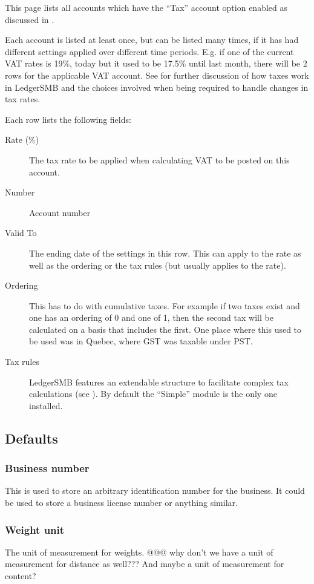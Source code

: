 This page lists all accounts which have the ``Tax'' account option enabled as discussed in .

Each account is listed at least once, but can be listed many times, if it has had different
settings applied over different time periods. E.g. if one of the current VAT rates is 19\%,
today but it used to be 17.5\% until last month, there will be 2 rows for the applicable
VAT account. See  for further discussion of how taxes work in
LedgerSMB and the choices involved when being required to handle changes in tax rates.

Each row lists the following fields:

\begin{description}
\item [Rate (\%)] The tax rate to be applied when calculating VAT to be posted on this account.
\item [Number] Account number
\item [Valid To] The ending date of the settings in this row. This can apply to the rate as well as the ordering or the tax rules (but usually applies to the rate).
\item [Ordering] This has to do with cumulative taxes.  For example if two taxes
exist and one has an ordering of 0 and one of 1, then the second tax will be
calculated on a basis that includes the first.  One place where this used to be
used was in Quebec, where GST was taxable under PST.
\item [Tax rules] LedgerSMB features an extendable structure to facilitate complex tax
calculations (see ). By default the ``Simple'' module
is the only one installed.
\end{description}

\subsection{Defaults}
\label{subsec:Defaults}

\subsubsection{Business number}
   This is used to store an arbitrary identification number for the business.  It
could be used to store a business license number or anything similar.
   
\subsubsection{Weight unit}
   The unit of measurement for weights. @@@ why don't we have a unit of measurement for distance as well??? And maybe a unit of measurement for content?
   
